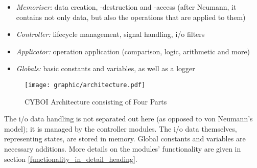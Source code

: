 \begin{itemize}
    \item \emph{Memoriser:} data creation, -destruction and -access (after
        Neumann, it contains not only data, but also the operations that are
        applied to them)
    \item \emph{Controller:} lifecycle management, signal handling, i/o filters
    \item \emph{Applicator:} operation application (comparison, logic,
        arithmetic and more)
    \item \emph{Globals:} basic constants and variables, as well as a logger
\end{itemize}

\begin{figure}[ht]
    \begin{center}
        \texttt{[image: graphic/architecture.pdf]}
        \caption{CYBOI Architecture consisting of Four Parts}
        \label{architecture_figure}
    \end{center}
\end{figure}

The i/o data handling is not separated out here (as opposed to von Neumann's
model); it is managed by the controller modules. The i/o data themselves,
representing states, are stored in memory. Global constants and variables are
necessary additions. More details on the modules' functionality are given in
section \ref{functionality_in_detail_heading}.

